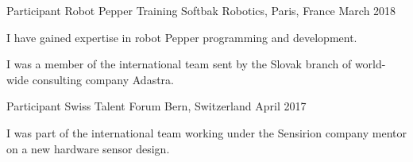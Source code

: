 
\begin{cventries}
	
	\cventry
	{Participant}
	{Robot Pepper Training}
	{Softbak Robotics, Paris, France}
	{March 2018}
	{
		\begin{cvitems}
			\item {I have gained expertise in robot Pepper programming and development.}
			\item {I was a member of the international team sent by the Slovak branch of world-wide consulting company Adastra.}
		\end{cvitems}
	}
	
	\cventry
	{Participant}
	{Swiss Talent Forum}
	{Bern, Switzerland}
	{April 2017}
	{
		\begin{cvitems}
			\item {I was part of the international team working under the Sensirion company mentor on a new hardware sensor design.}
		\end{cvitems}
    }
	
\end{cventries}
